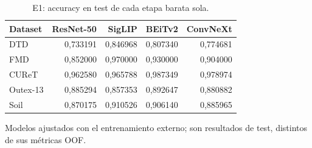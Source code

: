 \begin{table}[!htbp]\centering
\fontsize{8}{10}\selectfont\setlength{\tabcolsep}{4pt}
\caption{E1: accuracy en test de cada etapa barata sola.}\label{tab:e1-bases-test}
\begin{tabular}{@{}lrrrr@{}}\toprule
Dataset & ResNet-50 & SigLIP & BEiTv2 & ConvNeXt\\\midrule
DTD & 0,733191 & 0,846968 & 0,807340 & 0,774681\\
FMD & 0,852000 & 0,970000 & 0,930000 & 0,904000\\
CUReT & 0,962580 & 0,965788 & 0,987349 & 0,978974\\
Outex-13 & 0,885294 & 0,857353 & 0,892647 & 0,880882\\
Soil & 0,870175 & 0,910526 & 0,906140 & 0,885965\\
\bottomrule\end{tabular}
\par\smallskip\begin{minipage}{0.98\textwidth}\footnotesize Modelos ajustados con el entrenamiento externo; son resultados de test, distintos de sus métricas OOF.\end{minipage}
\end{table}
